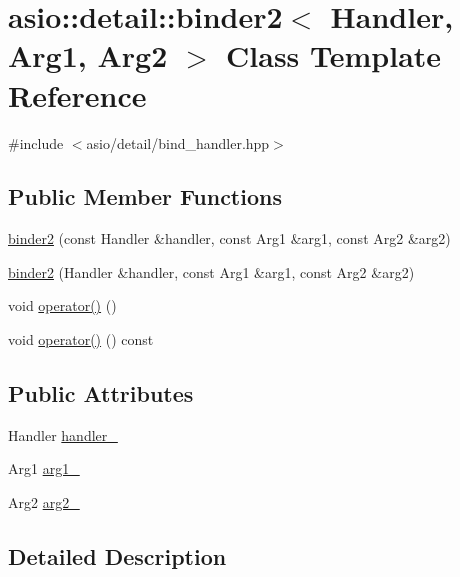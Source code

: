\hypertarget{classasio_1_1detail_1_1binder2}{}\section{asio\+:\+:detail\+:\+:binder2$<$ Handler, Arg1, Arg2 $>$ Class Template Reference}
\label{classasio_1_1detail_1_1binder2}


{\ttfamily \#include $<$asio/detail/bind\+\_\+handler.\+hpp$>$}

\subsection*{Public Member Functions}
\begin{DoxyCompactItemize}
\item 
\hyperlink{classasio_1_1detail_1_1binder2_a3356853000163531f1924b04350be3cc}{binder2} (const Handler \&handler, const Arg1 \&arg1, const Arg2 \&arg2)
\item 
\hyperlink{classasio_1_1detail_1_1binder2_a8812e71f6a4121bd57887fe2928c1160}{binder2} (Handler \&handler, const Arg1 \&arg1, const Arg2 \&arg2)
\item 
void \hyperlink{classasio_1_1detail_1_1binder2_a10f8214abd05320d39a1b8338cb9f725}{operator()} ()
\item 
void \hyperlink{classasio_1_1detail_1_1binder2_a01c508a10a465d8be8792a8f81eb2b1b}{operator()} () const 
\end{DoxyCompactItemize}
\subsection*{Public Attributes}
\begin{DoxyCompactItemize}
\item 
Handler \hyperlink{classasio_1_1detail_1_1binder2_a1443f32c77da165b216af1d1ae7a42fd}{handler\+\_\+}
\item 
Arg1 \hyperlink{classasio_1_1detail_1_1binder2_ad03c34f96ee8956653cb24dc56ecead4}{arg1\+\_\+}
\item 
Arg2 \hyperlink{classasio_1_1detail_1_1binder2_a4e200aef85dfd3813938c5e3364cdd2e}{arg2\+\_\+}
\end{DoxyCompactItemize}


\subsection{Detailed Description}
